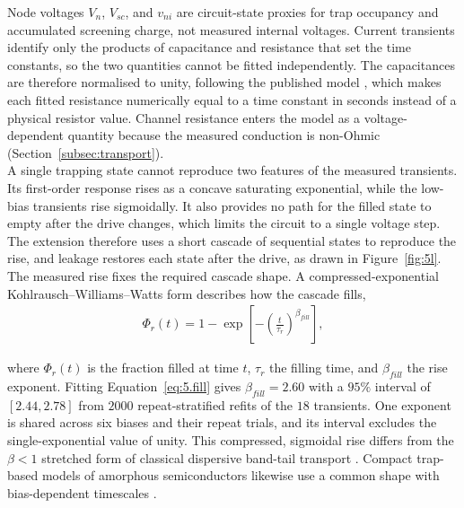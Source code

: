 \noindent Node voltages $V_n$, $V_{sc}$, and $v_{ni}$ are circuit-state proxies for trap occupancy and
accumulated screening charge, not measured internal voltages. Current transients identify only the products
of capacitance and resistance that set the time constants, so the two quantities cannot be fitted independently. The
capacitances are therefore normalised to unity, following the published model \cite{mannion2023compact}, which makes
each fitted resistance numerically equal to a time constant in seconds instead of a physical resistor value. Channel
resistance enters the model as a voltage-dependent quantity because the measured conduction is non-Ohmic
(Section~\ref{subsec:transport}).\\

\noindent A single trapping state cannot reproduce two features of the measured transients. Its first-order response
rises as a concave saturating exponential, while the low-bias transients rise sigmoidally. It also provides no path
for the filled state to empty after the drive changes, which limits the circuit to a single voltage step. The
extension therefore uses a short cascade of sequential states to reproduce the rise, and leakage restores each state
after the drive, as drawn in Figure~\ref{fig:5l}.\\

\noindent The measured rise fixes the required cascade shape. A compressed-exponential
Kohlrausch--Williams--Watts form describes how the cascade fills,
\begin{align}
    \Phi_r(t) = 1 - \exp\!\left[ -\left( \frac{t}{\tau_r} \right)^{\!\beta_{fill}} \right], \label{eq:5.fill}
\end{align}

\noindent where $\Phi_r(t)$ is the fraction filled at time $t$, $\tau_r$ the filling time, and $\beta_{fill}$ the
rise exponent. Fitting Equation~\ref{eq:5.fill} gives
$\beta_{fill}=2.60$ with a $95\%$ interval of $[2.44,2.78]$ from $2000$ repeat-stratified refits of the $18$
transients. One exponent is shared across six biases and their repeat trials, and its interval excludes the
single-exponential value of unity. This compressed, sigmoidal rise differs from the $\beta<1$ stretched form of
classical dispersive band-tail transport \cite{scher1975anomalous,kakalios1987stretched}. Compact trap-based models
of amorphous semiconductors likewise use a common shape with bias-dependent timescales
\cite{libsch1993bias,kim2022compact}.\\

